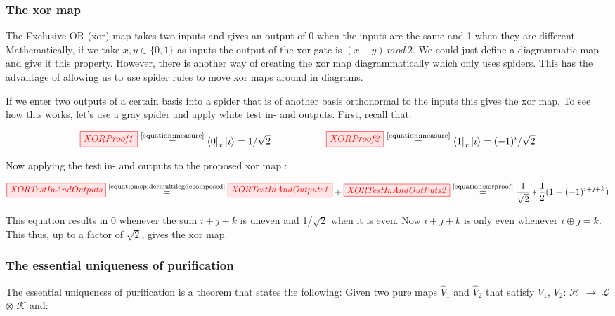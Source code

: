 \documentclass[]{article}
\newcommand{\equaltext}[1]{\ensuremath{\stackrel{\text{#1}}{=}}}
\begin{document}
\subsubsection{The xor map}

\label{xorgate}

The Exclusive OR (xor) map takes two inputs and gives an output of 0 when the inputs are the same and 1 when they are different. Mathematically, if we take $x, y \in \{0,1\} $ as inputs the output of the xor gate is $(x + y)~mod~2$. We could just define a diagrammatic map and give it this property. However, there is another way of creating the xor map diagrammatically which only uses spiders. This has the advantage of allowing us to use spider rules to move xor maps around in diagrams.

If we enter two outputs of a certain basis into a spider that is of another basis orthonormal to the inputs this gives the xor map. To see how this works, let's use a gray spider and apply white test in- and outputs. First, recall that:

\begin{equation}
\label{equation:xorproof}
	\tikzfig{XORProof1} \equaltext{\ref{equation:measure}} \bra{0}_x\ket{i} =  1/\sqrt{2} ~~~~~~~~~~~~~~~~~ \tikzfig{XORProof2} \equaltext{\ref{equation:measure}} \bra{1}_x\ket{i} = (-1)^i/\sqrt{2}
\end{equation}

Now applying the test in- and outputs to the proposed xor map \cite{Coecke2017}:

\begin{equation}
	\label{equation:xormap}
	\tikzfig{XORTestInAndOutputs} \equaltext{\ref{equation:spidermultilegdecomposed}} \tikzfig{XORTestInAndOutputs1} + \tikzfig{XORTestInAndOutPuts2} \equaltext{\ref{equation:xorproof}} \frac{1}{\sqrt{2}} * \frac{1}{2}(1+(-1)^{i+j+k})
\end{equation}

This equation results in 0 whenever the sum $i+j+k$ is uneven and 1/$\sqrt{2}$ when it is even. Now $i+j+k$ is only even whenever $i \oplus j = k$. This thus, up to a factor of $\sqrt{2}$, gives the xor map.

\subsubsection{The essential uniqueness of purification}
\label{section:essentialuniqueness}

The essential uniqueness of purification is a theorem that states the following: Given two pure maps $\hat{V}_1$ and $\hat{V}_2$ that satisfy $V_1$, $V_2$: $\mathcal{H}$ $\rightarrow$ $\mathcal{L}$ $\otimes$ $\mathcal{K}$ and:
\end{document}
